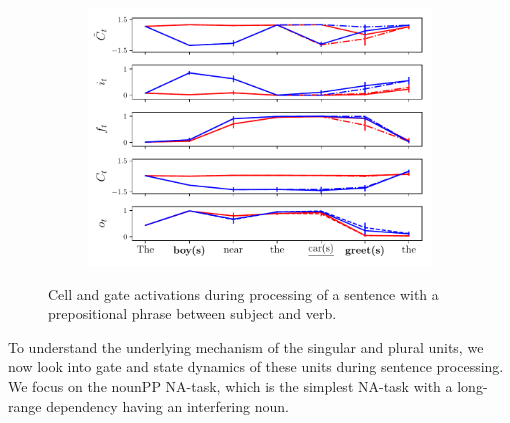 \begin{figure}[ht]
\begin{subfigure}{0.3\textwidth}
    \label{fig:singular-unit}
    \end{subfigure}
    \begin{subfigure}{0.3\textwidth}
            \centering
            \includegraphics[width=\linewidth]{Figures/nounpp_775.pdf}
    \label{fig:plural-unit}
    \end{subfigure}
\caption{Cell and gate activations during processing of a sentence with a prepositional phrase between subject and verb.}
\end{figure}

To understand the underlying mechanism of the singular and plural units, we now look into gate and state dynamics of these units during sentence processing. We focus on the nounPP NA-task, which is the simplest NA-task with a long-range dependency having an interfering noun. 

